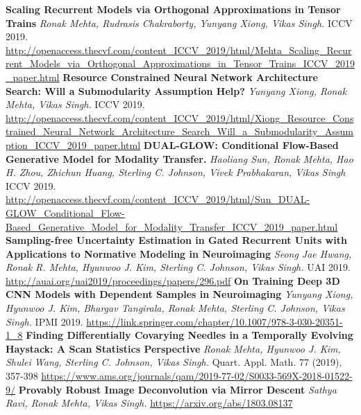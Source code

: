 \documentclass[]{article}
\begin{document}
\noindent
{\bf Scaling Recurrent Models via Orthogonal Approximations in Tensor Trains}
\newline
\textit{Ronak Mehta, Rudrasis Chakraborty, Yunyang Xiong, Vikas Singh.}
\newline
ICCV 2019. \url{http://openaccess.thecvf.com/content_ICCV_2019/html/Mehta_Scaling_Recurrent_Models_via_Orthogonal_Approximations_in_Tensor_Trains_ICCV_2019_paper.html}
\newline\newline
{\bf Resource Constrained Neural Network Architecture Search: Will a Submodularity Assumption Help?}
\newline
\textit{Yunyang Xiong, Ronak Mehta, Vikas Singh.}
\newline
ICCV 2019. \url{http://openaccess.thecvf.com/content_ICCV_2019/html/Xiong_Resource_Constrained_Neural_Network_Architecture_Search_Will_a_Submodularity_Assumption_ICCV_2019_paper.html}
\newline\newline
{\bf  DUAL-GLOW: Conditional Flow-Based Generative Model for Modality Transfer.}
\newline
\textit{Haoliang Sun, Ronak Mehta, Hao H. Zhou, Zhichun Huang, Sterling C. Johnson, Vivek Prabhakaran, Vikas Singh}
\newline
ICCV 2019. \url{http://openaccess.thecvf.com/content_ICCV_2019/html/Sun_DUAL-GLOW_Conditional_Flow-Based_Generative_Model_for_Modality_Transfer_ICCV_2019_paper.html}
\newline\newline
{\bf Sampling-free Uncertainty Estimation in Gated Recurrent Units with Applications to Normative Modeling in Neuroimaging }
\newline
\textit{Seong Jae Hwang, Ronak R. Mehta, Hyunwoo J. Kim, Sterling C. Johnson, Vikas Singh.}
\newline
UAI 2019. \url{http://auai.org/uai2019/proceedings/papers/296.pdf}
\newline\newline
{\bf On Training Deep 3D CNN Models with Dependent Samples in Neuroimaging}
\newline
\textit{Yunyang Xiong, Hyunwoo J. Kim, Bhargav Tangirala, Ronak Mehta, Sterling C. Johnson, Vikas Singh.}
\newline
IPMI 2019. \url{https://link.springer.com/chapter/10.1007/978-3-030-20351-1_8}
\newline\newline
{\bf   Finding Differentially Covarying Needles in a Temporally Evolving Haystack: A Scan Statistics Perspective }
\newline
\textit{Ronak Mehta, Hyunwoo J. Kim, Shulei Wang, Sterling C. Johnson, Vikas Singh.}
\newline
Quart. Appl. Math. 77 (2019), 357-398
\newline \url{https://www.ams.org/journals/qam/2019-77-02/S0033-569X-2018-01522-9/}
\newline\newline
{\bf Provably Robust Image Deconvolution via Mirror Descent}
\newline
\textit{Sathya Ravi, Ronak Mehta, Vikas Singh.}
\newline
\url{https://arxiv.org/abs/1803.08137}
\end{document}
